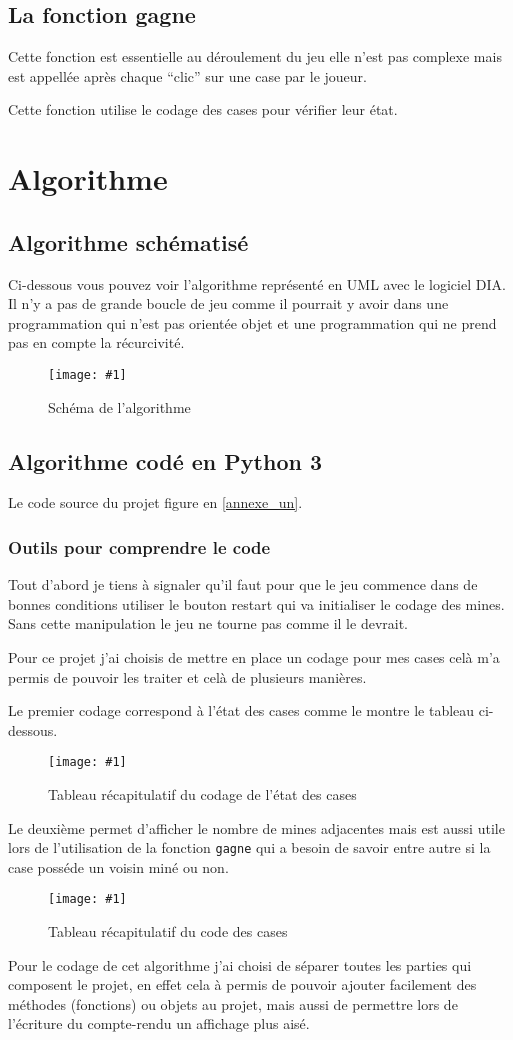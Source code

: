 \documentclass[a4paper,11pt]{article}
\newcommand{\monimage}[4]{
\par\noindent
\begin{figure}[H] %
\begin{center}
\texttt{[image: \#1]} %
\caption{#2} %
\label{#3} %
\end{center}
\end{figure} %
}
\newcommand{\ml}[0]{\par\noindent}
\begin{document}
\subsection{La fonction gagne}
Cette fonction est essentielle au déroulement du jeu elle n'est pas complexe mais est appellée après chaque ``clic'' sur une case
par le joueur.
\ml
Cette fonction utilise le codage des cases pour vérifier leur état.
\section{Algorithme}
\subsection{Algorithme schématisé}
Ci-dessous vous pouvez voir l'algorithme représenté en UML avec le logiciel DIA. Il n'y a pas de grande boucle de jeu comme il
pourrait y avoir dans une programmation qui n'est pas orientée objet et une programmation qui ne prend pas en compte la 
récurcivité.
\ml
\monimage{schemademineur.png}{Schéma de l'algorithme}{ALGO}{15}
\subsection{Algorithme codé en Python 3}
Le code source du projet figure en \ref{annexe_un}.
\subsubsection{Outils pour comprendre le code}
Tout d'abord je tiens à signaler qu'il faut pour que le jeu commence dans de bonnes conditions utiliser le bouton restart
qui va initialiser le codage des mines. Sans cette manipulation le jeu ne tourne pas comme il le devrait.
\ml
Pour ce projet j'ai choisis de mettre en place un codage pour mes cases celà m'a permis de pouvoir les traiter et celà
de plusieurs manières.
\ml
Le premier codage correspond à l'état des cases comme le montre le tableau ci-dessous.
\monimage{etat.png}{Tableau récapitulatif du codage de l'état des cases}{etat}{10}
\ml
Le deuxième permet d'afficher le nombre de mines adjacentes mais est aussi utile lors de l'utilisation de la fonction {\tt gagne}
qui a besoin de savoir entre autre si la case posséde un voisin miné ou non.
\monimage{code.png}{Tableau récapitulatif du code des cases}{code}{10}
\ml
Pour le codage de cet algorithme j'ai choisi de séparer toutes les parties qui composent le projet,
en effet cela à permis de pouvoir ajouter facilement des méthodes (fonctions) ou objets au projet, mais aussi de permettre
lors de l'écriture du compte-rendu un affichage plus aisé.
\end{document}
